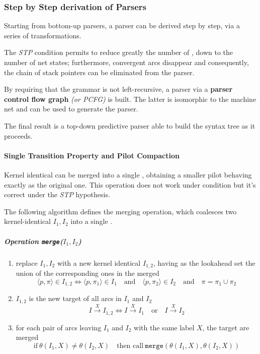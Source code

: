 \documentclass[english]{article}
\begin{document}
\subsubsection[Step by Step derivation of ELL(1) Parsers]{Step by Step derivation of \ello Parsers}

Starting from bottom-up parsers, a \ello parser can be derived step by step, via a series of transformations.

The \textit{STP} condition permits to reduce greatly the number of \mstates, down to the number of net states;
furthermore, convergent arcs disappear and consequently, the chain of stack pointers can be eliminated from the parser.

By requiring that the grammar is not left-recursive, a parser via a \textbf{parser control flow graph} \textit{(or PCFG)} is built.
The latter is isomorphic to the machine net and can be used to generate the parser.

The final result is a top-down predictive parser able to build the syntax tree as it proceeds.

\paragraph{Single Transition Property and Pilot Compaction}

Kernel identical \mstates can be merged into a single \mstate, obtaining a smaller pilot behaving exactly as the original one.
This operation does not work under \elro condition but it's correct under the \textit{STP} hypothesis.

The following algorithm defines the merging operation, which coalesces two kernel-identical \mstates \(I_1, I_2\) into a single \mstate.

\subparagraph*{Operation \texttt{merge}(\(I_1, I_2\))}

\begin{enumerate}
  \item replace \mstates \(I_1, I_2\) with a new kernel identical \mstate \(I_{1,2}\), having as the lookahead set the union of the corresponding ones in the merged \mstates
        \[ \langle p, \pi \rangle \in I_{1, 2} \iff \langle p, \pi_1 \rangle \in I_1 \quad \text{and} \quad \langle p, \pi_2 \rangle \in I_2 \quad \text{and} \quad \pi = \pi_1 \cup \pi_2 \]
  \item \mstate \(I_{1,2}\) is the new target of all arcs in \(I_1\) and \(I_2\)
        \[ I \xrightarrow{X} I_{1,2} \iff I \xrightarrow{X} I_1 \quad \text{or} \quad I \xrightarrow{X} I_2 \]
  \item for each pair of arcs leaving \(I_1\) and \(I_2\) with the same label \(X\), the target \mstates are merged
        \[ \text{if} \ \theta(I_1, X) \neq \theta(I_2, X) \quad \text{then call} \ \texttt{merge}(\theta(I_1, X), \theta(I_2, X)) \]
\end{enumerate}
\end{document}
